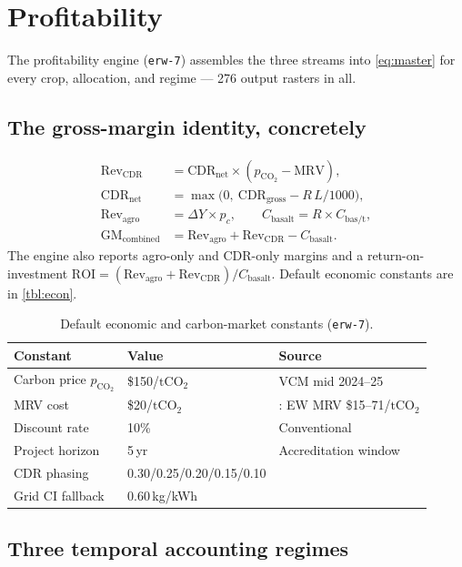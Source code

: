\documentclass[openany]{book}
\newcommand{\co}{\ensuremath{\mathrm{CO_2}}}
\newcommand{\tco}{\ensuremath{\mathrm{tCO_2}}}
\begin{document}
\chapter{Profitability}\label{ch:profit}

The profitability engine (\texttt{erw-7}) assembles the three streams into
\autoref{eq:master} for every crop, allocation, and regime --- 276 output
rasters in all.

\section{The gross-margin identity, concretely}

\begin{align}
\mathrm{Rev_{CDR}} &= \mathrm{CDR_{net}}\times(p_{\co} - \mathrm{MRV}),
  \label{eq:revcdr}\\
\mathrm{CDR_{net}} &= \max\!\big(0,\ \mathrm{CDR_{gross}} - R\,L/1000\big),\\
\mathrm{Rev_{agro}} &= \Delta Y \times p_c,\qquad
  C_{\text{basalt}} = R \times C_{\text{bas/t}}, \label{eq:revagro}\\
\mathrm{GM_{combined}} &= \mathrm{Rev_{agro}} + \mathrm{Rev_{CDR}}
  - C_{\text{basalt}}. \label{eq:gm}
\end{align}
%
The engine also reports agro-only and CDR-only margins and a return-on-investment
$\mathrm{ROI} = (\mathrm{Rev_{agro}}+\mathrm{Rev_{CDR}})/C_{\text{basalt}}$.
Default economic constants are in \autoref{tbl:econ}.

\begin{longtable}[]{@{}lll@{}}
\caption{Default economic and carbon-market constants (\texttt{erw-7}).}\label{tbl:econ}\\
\toprule
Constant & Value & Source \\
\midrule
\endhead
Carbon price $p_{\co}$ & \$150/\tco & VCM mid 2024--25 \citep{levy2024} \\
MRV cost & \$20/\tco & \citet{mercer2024}: EW MRV \$15--71/\tco \\
Discount rate & 10\% & Conventional \\
Project horizon & 5\,yr & Accreditation window \\
CDR phasing & 0.30/0.25/0.20/0.15/0.10 & \citet{kanzaki2023} \\
Grid CI fallback & 0.60\,kg/kWh & \citet{ipcc2019} \\
\bottomrule
\end{longtable}

\section{Three temporal accounting regimes}
\end{document}
